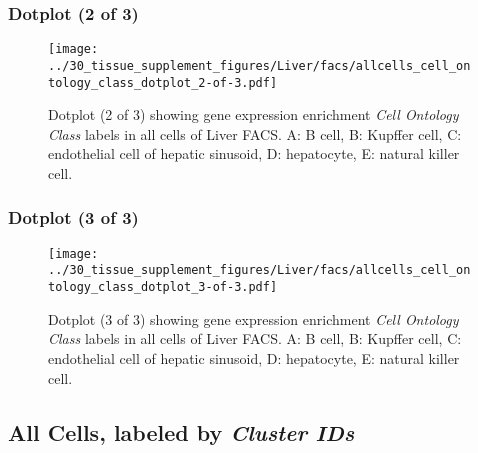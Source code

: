 \clearpage

\subsubsection{Dotplot (2 of 3)}
\begin{figure}[h]
\centering
\texttt{[image: ../30\_tissue\_supplement\_figures/Liver/facs/allcells\_cell\_ontology\_class\_dotplot\_2-of-3.pdf]}

\caption{ Dotplot (2 of 3)  showing gene expression enrichment \emph{Cell Ontology Class} labels in all cells of Liver FACS. A: B cell, B: Kupffer cell, C: endothelial cell of hepatic sinusoid, D: hepatocyte, E: natural killer cell.}
\end{figure}


\clearpage

\subsubsection{Dotplot (3 of 3)}
\begin{figure}[h]
\centering
\texttt{[image: ../30\_tissue\_supplement\_figures/Liver/facs/allcells\_cell\_ontology\_class\_dotplot\_3-of-3.pdf]}

\caption{ Dotplot (3 of 3)  showing gene expression enrichment \emph{Cell Ontology Class} labels in all cells of Liver FACS. A: B cell, B: Kupffer cell, C: endothelial cell of hepatic sinusoid, D: hepatocyte, E: natural killer cell.}
\end{figure}


\clearpage

\subsection{All Cells, labeled by \emph{Cluster IDs}}
